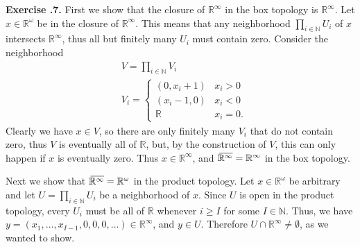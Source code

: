 \documentclass{article}
\theoremstyle{definition}
\theoremstyle{remark}
\newenvironment{exc}[1]{\noindent\textbf{Exercise \thesubsection.#1.}}{\medskip}
\newcommand{\N}{\mathbb{N}}
\newcommand{\R}{\mathbb{R}}
\newcommand{\closure}[2][3]{%
{}\mkern#1mu\overline{\mkern-#1mu#2}}
\begin{document}
\begin{exc}{7}
    First we show that the closure of $\R^\infty$ in the box topology is $\R^\infty$. Let $x \in \R^\omega$ be in the closure of $\R^\infty$. This means that any neighborhood $\prod_{i \in \N} U_i$ of $x$ intersects $\R^\infty$, thus all but finitely many $U_i$ must contain zero. Consider the neighborhood 
    \begin{align*}
        &V = \prod_{i \in \N} V_i \\
        &V_i = \begin{cases}
        (0, x_i + 1) & x_i > 0 \\
        (x_i-1, 0) & x_i < 0 \\
        \R & x_i = 0.
        \end{cases}
    \end{align*}
    Clearly we have $x \in V$, so there are only finitely many $V_i$ that do not contain zero, thus $V$ is eventually all of $\R$, but, by the construction of $V$, this can only happen if $x$ is eventually zero. Thus $x \in \R^\infty$, and $\closure{\R^\infty} = \R^\infty$ in the box topology.
    
    Next we show that $\closure{\R^\infty} = \R^\omega$ in the product topology. Let $x \in \R^\omega$ be arbitrary and let $U = \prod_{i \in \N} U_i$ be a neighborhood of $x$. Since $U$ is open in the product topology, every $U_i$ must be all of $\R$ whenever $i \geq I$ for some $I \in \N$. Thus, we have $y = (x_1, \dots, x_{I-1}, 0, 0, 0, \dots) \in \R^\infty$, and $y \in U$. Therefore $U \cap \R^\infty \neq \emptyset$, as we wanted to show.
    
\end{exc}
\end{document}
